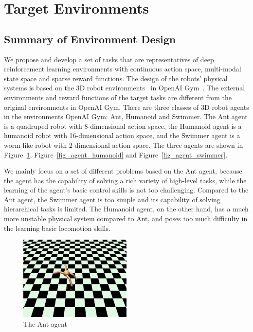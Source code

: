 \section{Target Environments}\label{sec_env}
\subsection{Summary of Environment Design}
We propose and develop a set of tasks that are representatives of deep reinforcement learning environments with continuous action space, multi-modal state space and sparse reward functions. The design of the robots' physical systems is based on the 3D robot environments~\cite{roboschool_2018} in OpenAI Gym~\cite{openaigym}. The external environments and reward functions of the target tasks are different from the original environments in OpenAI Gym. There are three classes of 3D robot agents in the environments OpenAI Gym: Ant, Humanoid and Swimmer. The Ant agent is a quadruped robot with 8-dimensional action space, the Humanoid agent is a humanoid robot with 16-dimensional action space, and the Swimmer agent is a worm-like robot with 2-dimensional action space.  The three agents are shown in Figure~\ref{fig_agent_ant}, Figure~\ref{fig_agent_humanoid} and Figure~\ref{fig_agent_swimmer}.

We mainly focus on a set of different problems based on the Ant agent, because the agent has the capability of solving a rich variety of high-level tasks, while the learning of the agent's basic control skills is not too challenging. 
Compared to the Ant agent, the Swimmer agent is too simple and its capability of solving hierarchical tasks is limited. The Humanoid agent, on the other hand, has a much more unstable physical system compared to Ant, and poses too much difficulty in the learning basic locomotion skills.
\begin{figure}[H]
	\includegraphics[width=0.5\textwidth]{images/agent_ant.png}
	\centering
	\caption{The Ant agent}\label{fig_agent_ant}
\end{figure}

